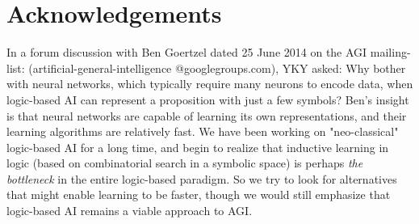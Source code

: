 \documentclass[orivec]{llncs}
\newcommand{\emp}[1]{\textbf{\textcolor{Cerulean}{#1}}}
\begin{document}
\section*{Acknowledgements}

\footnotesize{In a forum discussion with Ben Goertzel dated 25 June 2014 on the AGI mailing-list: (artificial-general-intelligence @googlegroups.com), YKY asked: Why bother with neural networks, which typically require many neurons to encode data, when logic-based AI can represent a proposition with just a few symbols?  Ben's insight is that neural networks are capable of learning its own representations, and their learning algorithms are relatively fast.  We have been working on "neo-classical" logic-based AI for a long time, and begin to realize that inductive learning in logic (based on combinatorial search in a symbolic space) is perhaps \textit{the bottleneck} in the entire logic-based paradigm.  So we try to look for alternatives that might enable learning to be faster, though we would still emphasize that logic-based AI remains a viable approach to AGI. %
}


\end{document}
